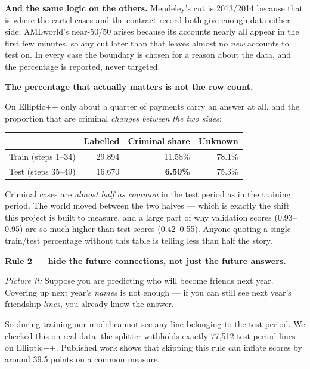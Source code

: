 \documentclass[11pt,a4paper]{article}
\newcommand{\pw}[1]{\textit{\textcolor{accent}{Picture it:}} #1}
\begin{document}
\begin{plain}
\textbf{And the same logic on the others.} Mendeley's cut is 2013/2014 because
that is where the cartel cases and the contract record both give enough data
either side; AMLworld's near-50/50 arises because its accounts nearly all appear
in the first few minutes, so any cut later than that leaves almost no
\emph{new} accounts to test on. In every case the boundary is chosen for a
reason about the data, and the percentage is reported, never targeted.
\end{plain}

\begin{keybox}
\textbf{The percentage that actually matters is not the row count.}

On Elliptic++ only about a quarter of payments carry an answer at all, and the
proportion that are criminal \emph{changes between the two sides}:

\begin{center}\small
\begin{tabular}{@{}lrrr@{}}
\toprule
 & \textbf{Labelled} & \textbf{Criminal share} & \textbf{Unknown} \\
\midrule
Train (steps 1--34) & 29{,}894 & 11.58\% & 78.1\% \\
Test (steps 35--49) & 16{,}670 & \textbf{6.50\%} & 75.3\% \\
\bottomrule
\end{tabular}
\end{center}

Criminal cases are \emph{almost half as common} in the test period as in the
training period. The world moved between the two halves --- which is exactly the
shift this project is built to measure, and a large part of why validation
scores (0.93--0.95) are so much higher than test scores (0.42--0.55). Anyone
quoting a single train/test percentage without this table is telling less than
half the story.
\end{keybox}

\begin{keybox}
\textbf{Rule 2 --- hide the future connections, not just the future answers.}

\pw{Suppose you are predicting who will become friends next year. Covering up
next year's \emph{names} is not enough --- if you can still see next year's
friendship \emph{lines}, you already know the answer.}

So during training our model cannot see any line belonging to the test period.
We checked this on real data: the splitter withholds exactly 77{,}512 test-period
lines on Elliptic++. Published work shows that skipping this rule can inflate
scores by around 39.5 points on a common measure.
\end{keybox}
\end{document}
